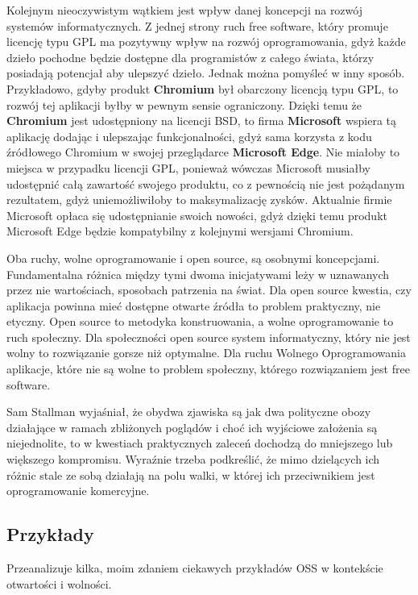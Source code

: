 \documentclass{article}
\begin{document}
Kolejnym nieoczywistym wątkiem jest wpływ danej koncepcji na rozwój systemów informatycznych. Z jednej strony ruch free software, który promuje licencję typu GPL ma pozytywny wpływ na rozwój oprogramowania, gdyż każde dzieło pochodne będzie dostępne dla programistów z całego świata, którzy posiadają potencjał aby ulepszyć dzieło. Jednak można pomyśleć w inny sposób. Przykładowo, gdyby produkt \textbf{Chromium} był obarczony licencją typu GPL, to rozwój tej aplikacji byłby w pewnym sensie ograniczony. Dzięki temu że \textbf{Chromium} jest udostępniony na licencji BSD, to firma \textbf{Microsoft} wspiera tą aplikację dodając i ulepszając funkcjonalności, gdyż sama korzysta z kodu źródłowego Chromium w swojej przeglądarce \textbf{Microsoft Edge}\cite{microsoft.edge}. Nie miałoby to miejsca w przypadku licencji GPL, ponieważ wówczas Microsoft musiałby udostępnić całą zawartość swojego produktu, co z pewnością nie jest pożądanym rezultatem, gdyż uniemożliwiłoby to maksymalizację zysków. Aktualnie firmie Microsoft opłaca się udostępnianie swoich nowości, gdyż dzięki temu produkt Microsoft Edge będzie kompatybilny z kolejnymi wersjami Chromium.

Oba ruchy, wolne oprogramowanie i open source, są osobnymi koncepcjami. Fundamentalna różnica między tymi dwoma inicjatywami leży w uznawanych przez nie wartościach, sposobach patrzenia na świat. Dla open source kwestia, czy aplikacja powinna mieć dostępne otwarte źródła to problem praktyczny, nie etyczny. Open source to metodyka konstruowania, a wolne oprogramowanie to ruch społeczny. Dla społeczności open source system informatyczny, który nie jest wolny to rozwiązanie gorsze niż optymalne. Dla ruchu Wolnego Oprogramowania aplikacje, które nie są wolne to problem społeczny, którego rozwiązaniem jest free software\cite{Kotula}.

Sam Stallman wyjaśniał, że obydwa zjawiska są jak dwa polityczne obozy działające w ramach zbliżonych poglądów i choć ich wyjściowe założenia są niejednolite, to w kwestiach praktycznych zaleceń dochodzą do mniejszego lub większego kompromisu. Wyraźnie trzeba podkreślić, że mimo dzielących ich różnic stale ze sobą działają na polu walki, w której ich przeciwnikiem jest oprogramowanie komercyjne\cite{Kotula}.

\subsection{Przykłady}

\hspace{4mm} Przeanalizuje kilka, moim zdaniem ciekawych przykładów OSS w kontekście otwartości i wolności.
\end{document}
